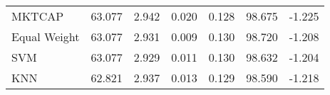 \begin{tabular}{lrrrrrr}
\toprule
MKTCAP       & 63.077 & 2.942 & 0.020 & 0.128 & 98.675 & -1.225 \\
Equal Weight & 63.077 & 2.931 & 0.009 & 0.130 & 98.720 & -1.208 \\
SVM          & 63.077 & 2.929 & 0.011 & 0.130 & 98.632 & -1.204 \\
KNN          & 62.821 & 2.937 & 0.013 & 0.129 & 98.590 & -1.218 \\
\bottomrule
\end{tabular}
